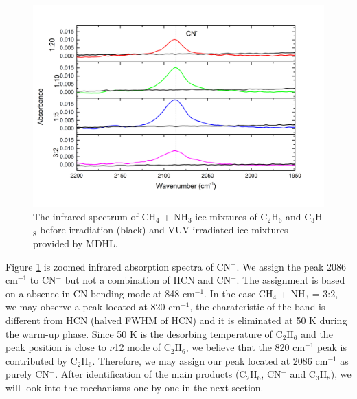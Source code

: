 \begin{figure}
\centering
\includegraphics[width=\textwidth]{figures/chapter3/CN.png}
\caption{The infrared spectrum of CH$_4$ + NH$_3$ ice mixtures of C$_2$H$_6$ and C$_3$H$_8$ before irradiation (black) and VUV irradiated ice mixtures provided by MDHL. }
\label{fig:CN}
\end{figure}

Figure \ref{fig:CN} is zoomed infrared absorption spectra of CN$^-$. We assign the peak 2086 cm$^{-1}$ to CN$^-$  but not a combination of HCN and CN$^-$. The assignment is based on a absence in CN bending mode at 848 cm$^{-1}$. In the case CH$_4$ + NH$_3$ = 3:2, we may observe a peak located at 820 cm$^{-1}$, the charateristic of the band is different from HCN (halved FWHM of HCN) and it is eliminated at 50 K during the warm-up phase. Since 50 K is the desorbing temperature of C$_2$H$_6$ and the peak position is close to $\nu$12 mode of C$_2$H$_6$, we believe that the 820 cm$^{-1}$ peak is contributed by C$_2$H$_6$. Therefore, we may assign our peak located at 2086 cm$^{-1}$ as purely CN$^-$. After identification of the main products (C$_2$H$_6$, CN$^-$ and C$_3$H$_8$), we will look into the mechanisms one by one in the next section.\\

